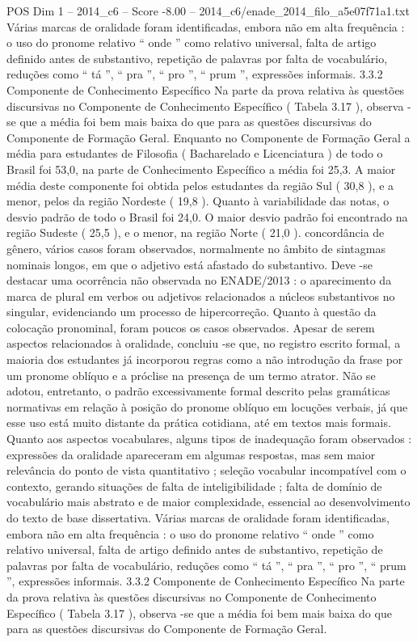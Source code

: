 \begin{textsample}{POS Dim 1 – 2014\_c6 – Score -8.00 – 2014\_c6/enade\_2014\_filo\_a5e07f71a1.txt}
Várias marcas de oralidade foram identificadas, embora não em alta frequência : o uso do pronome relativo “ onde ” como relativo universal, falta de artigo definido antes de substantivo, repetição de palavras por falta de vocabulário, reduções como “ tá ”, “ pra ”, “ pro ”, “ prum ”, expressões informais. 3.3.2 Componente de Conhecimento Específico Na parte da prova relativa às questões discursivas no Componente de Conhecimento Específico ( Tabela 3.17 ), observa -se que a média foi bem mais baixa do que para as questões discursivas do Componente de Formação Geral.
Enquanto no Componente de Formação Geral a média para estudantes de Filosofia ( Bacharelado e Licenciatura ) de todo o Brasil foi 53,0, na parte de Conhecimento Específico a média foi 25,3.
A maior média deste componente foi obtida pelos estudantes da região Sul ( 30,8 ), e a menor, pelos da região Nordeste ( 19,8 ).
Quanto à variabilidade das notas, o desvio padrão de todo o Brasil foi 24,0.
O maior desvio padrão foi encontrado na região Sudeste ( 25,5 ), e o menor, na região Norte ( 21,0 ). concordância de gênero, vários casos foram observados, normalmente no âmbito de sintagmas nominais longos, em que o adjetivo está afastado do substantivo.
Deve -se destacar uma ocorrência não observada no ENADE/2013 : o aparecimento da marca de plural em verbos ou adjetivos relacionados a núcleos substantivos no singular, evidenciando um processo de hipercorreção.
Quanto à questão da colocação pronominal, foram poucos os casos observados.
Apesar de serem aspectos relacionados à oralidade, concluiu -se que, no registro escrito formal, a maioria dos estudantes já incorporou regras como a não introdução da frase por um pronome oblíquo e a próclise na presença de um termo atrator.
Não se adotou, entretanto, o padrão excessivamente formal descrito pelas gramáticas normativas em relação à posição do pronome oblíquo em locuções verbais, já que esse uso está muito distante da prática cotidiana, até em textos mais formais.
Quanto aos aspectos vocabulares, alguns tipos de inadequação foram observados : expressões da oralidade apareceram em algumas respostas, mas sem maior relevância do ponto de vista quantitativo ; seleção vocabular incompatível com o contexto, gerando situações de falta de inteligibilidade ; falta de domínio de vocabulário mais abstrato e de maior complexidade, essencial ao desenvolvimento do texto de base dissertativa.
Várias marcas de oralidade foram identificadas, embora não em alta frequência : o uso do pronome relativo “ onde ” como relativo universal, falta de artigo definido antes de substantivo, repetição de palavras por falta de vocabulário, reduções como “ tá ”, “ pra ”, “ pro ”, “ prum ”, expressões informais. 3.3.2 Componente de Conhecimento Específico Na parte da prova relativa às questões discursivas no Componente de Conhecimento Específico ( Tabela 3.17 ), observa -se que a média foi bem mais baixa do que para as questões discursivas do Componente de Formação Geral.

\end{textsample}
